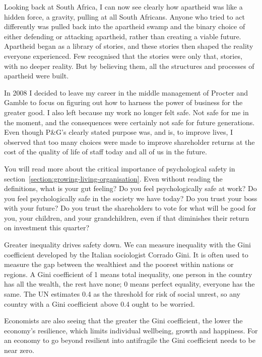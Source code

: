 Looking back at South Africa, I can now see clearly how apartheid was like a hidden force, a gravity, pulling at all South Africans. Anyone who tried to act differently was pulled back into the apartheid swamp and the binary choice of either defending or attacking apartheid, rather than creating a viable future. Apartheid began as a library of stories, and these stories then shaped the reality everyone experienced. Few recognised that the stories were only that, stories, with no deeper reality. But by believing them, all the structures and processes of apartheid were built. 


In 2008 I decided to leave my career in the middle management of Procter and Gamble to focus on figuring out how to harness the power of business for the greater good. I also left because my work no longer felt safe. Not safe for me in the moment, and the consequences were certainly not safe for future generations. Even though P\&G’s clearly stated purpose was, and is, to improve lives, I observed that too many choices were made to improve shareholder returns at the cost of the quality of life of staff today and all of us in the future. 


You will read more about the critical importance of psychological safety in section~\ref{section:growing-living-organisation}. Even without reading the definitions, what is your gut feeling? Do you feel psychologically safe at work? Do you feel psychologically safe in the society we have today? Do you trust your boss with your future? Do you trust the shareholders to vote for what will be good for you, your children, and your grandchildren, even if that diminishes their return on investment this quarter?


Greater inequality drives safety down. We can measure inequality with the Gini coefficient developed by the Italian sociologist Corrado Gini. It is often used to measure the gap between the wealthiest and the poorest within nations or regions. A Gini coefficient of 1 means total inequality, one person in the country has all the wealth, the rest have none; 0 means perfect equality, everyone has the same. The UN estimates 0.4 as the threshold for risk of social unrest, so any country with a Gini coefficient above 0.4 ought to be worried.


Economists are also seeing that the greater the Gini coefficient, the lower the economy’s resilience, which limits individual wellbeing, growth and happiness. For an economy to go beyond resilient into antifragile the Gini coefficient needs to be near zero.


